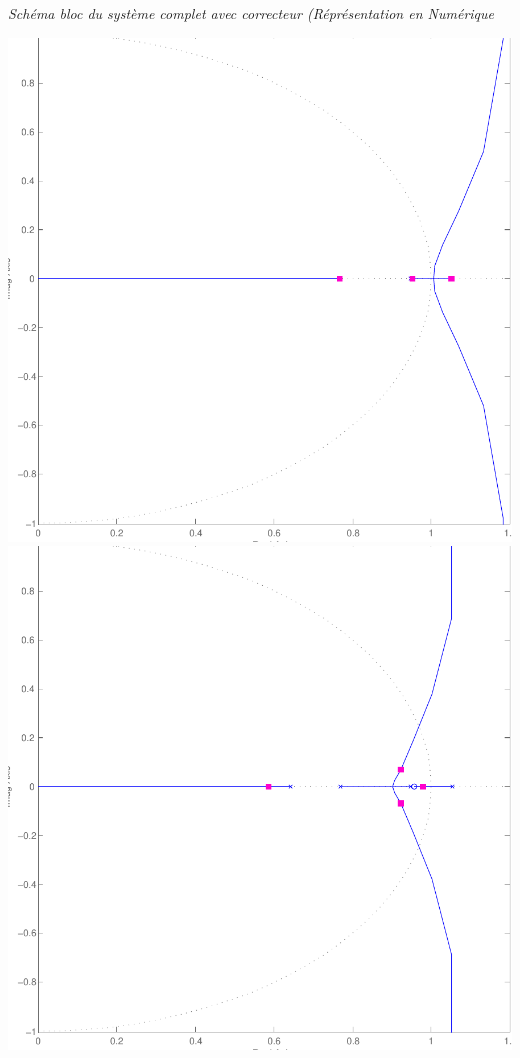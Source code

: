 \documentclass[11pt, french]{article} %
\begin{document}
\begin{center}

\emph{Schéma bloc du système complet avec correcteur (Réprésentation en Numérique}
\end{center}

\includegraphics[scale=0.50]{RLN_Sys_Seul.pdf}
\includegraphics[scale=0.50]{RLN_Sys_AvPh_K10.pdf}
\end{document}
